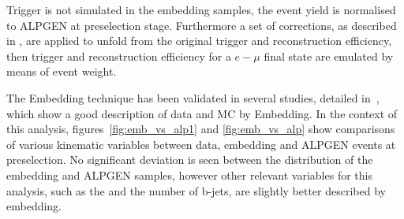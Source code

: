 

Trigger is not simulated in the embedding samples, the event yield
is normalised to ALPGEN \Ztautau at preselection stage. Furthermore a set of corrections, as described in \cite{SMnew}, are
applied to unfold from the original \Zmumu trigger and reconstruction efficiency, then trigger and reconstruction efficiency 
for a $e-\mu$ final state are emulated by means of event weight.

The Embedding technique has been validated in several studies, detailed in~\cite{Embedding, SMnew}, which show a good description of 
data and \Ztautau MC by Embedding. In the context of this analysis, 
figures~\ref{fig:emb_vs_alp1} and \ref{fig:emb_vs_alp} show comparisons of various kinematic variables between
data, embedding and ALPGEN \Ztautau events at preselection. No significant deviation is seen 
between the \mmc distribution of the embedding and ALPGEN samples, 
however other relevant variables for this analysis, such as the \MET 
and the number of b-jets, are slightly better described by embedding. 

